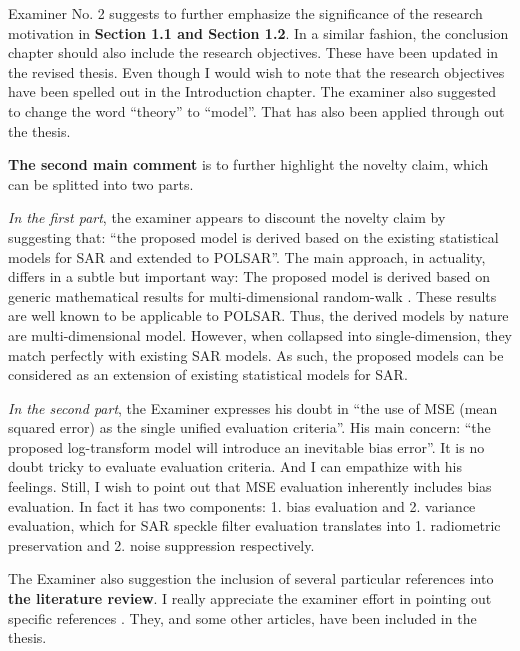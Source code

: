 Examiner No. 2 suggests to further emphasize the significance of the research motivation in \textbf{Section 1.1 and Section 1.2}.
In a similar fashion, the conclusion chapter should also include the research objectives.
These have been updated in the revised thesis.
Even though I would wish to note that the research objectives have been spelled out in the Introduction chapter.
The examiner also suggested to change the word ``theory'' to ``model''.
That has also been applied through out the thesis.

\textbf{The second main comment} is to further highlight the novelty claim, which can be splitted into two parts.

\textit{In the first part}, the examiner appears to discount the novelty claim by suggesting that:
 ``the proposed model is derived based on the existing statistical models for SAR and extended to POLSAR''.
The main approach, in actuality, differs in a subtle but important way:
The proposed model is derived based on generic mathematical results for multi-dimensional random-walk \cite{Goodman_JOptSocAm_76, Goodman_Springer_1975}.
These results are well known to be applicable to POLSAR.
Thus, the derived models by nature are multi-dimensional model.
However, when collapsed into single-dimension, they match perfectly with existing SAR models.
As such, the proposed models can be considered as an extension of existing statistical models for SAR.

\textit{In the second part}, the Examiner expresses his doubt in ``the use of MSE (mean squared error) as the single unified evaluation criteria''.
His main concern: ``the proposed log-transform model will introduce an inevitable bias error''.
It is no doubt tricky to evaluate evaluation criteria.
And I can empathize with his feelings.
Still, I wish to point out that MSE evaluation inherently includes bias evaluation. 
In fact it has two components: 1. bias evaluation and 2. variance evaluation, which for SAR speckle filter evaluation translates into 1. radiometric preservation and 2. noise suppression respectively.


The Examiner also suggestion the inclusion of several particular references into \textbf{the literature review}.
I really appreciate the examiner effort in pointing out specific references \cite{Argenti_GRSM_2013, Lee_RSReviews_1994, Cetin_ProcSPIE_2000, White_ProcSPIE_1994, Sattar_TIP_1997, Wang_TIP_2004, Nielsen_2012_ICASSP}.
They, and some other articles, have been included in the thesis.

